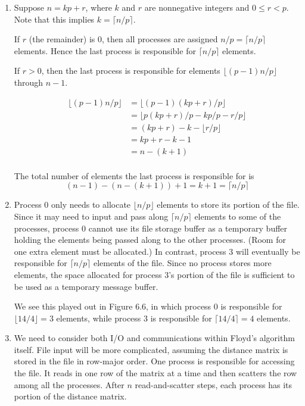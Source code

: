 \begin{enumerate}
\item Suppose $n = kp + r$, where $k$ and $r$ are nonnegative integers and
      $0 \le r < p$. Note that this implies $k = \lceil n/p\rceil$.

      If $r$ (the remainder) is 0, then all processes are
      assigned $n/p = \lceil n/p\rceil$ elements. Hence the last process is
      responsible for $\lceil n/p \rceil$ elements.

      If $r > 0$, then the last process is responsible for elements
      $\lfloor(p-1)n/p\rfloor$ through $n-1$.

\begin{equation*}
\begin{split}
\lfloor(p-1)n/p\rfloor &= \lfloor(p-1)(kp+r)/p\rfloor \\
                       &= \lfloor p(kp+r)/p - kp/p -r/p\rfloor \\
                       &= (kp + r) - k - \lfloor r/p\rfloor \\
                       &= kp + r - k - 1 \\
                       &= n - (k + 1)\\
\end{split}
\end{equation*}

      The total number of elements the last process is responsible for is
      $$(n - 1) - (n - (k+1)) + 1= k + 1 = \lceil n/p \rceil$$

\item Process 0 only needs to allocate $\lfloor n/p\rfloor$ elements to
      store its portion of the file.
      Since it may need to input and pass along
      $\lceil n/p\rceil$ elements to some of the processes, process 0 cannot
      use its file storage buffer as a temporary buffer holding the elements
      being passed along to the other processes. (Room for one extra element
      must be allocated.) In contrast, process 3 will eventually be responsible
      for $\lceil n/p\rceil$ elements of the file.
      Since no process stores more elements, the space allocated for
      process 3's portion of the file is sufficient to be used as a temporary
      message buffer.

      We see this played out in Figure 6.6, in which process 0 is responsible
      for $\lfloor 14/4\rfloor = 3$ elements, while process 3 is responsible
      for $\lceil 14/4\rceil = 4$ elements.

\item We need to consider both I/O and communications within Floyd's algorithm
      itself.
      File input will be more complicated, assuming the distance matrix
      is stored in the file in row-major order.
      One process is responsible for accessing the file.
      It reads in one row of the matrix at a time and then
      scatters the row among all the processes.
      After $n$ read-and-scatter steps, each process has its portion of
      the distance matrix.


\end{enumerate}
